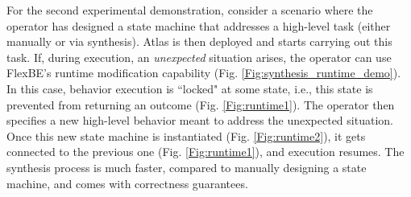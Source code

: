 For the second experimental demonstration, consider a scenario where the operator has designed a state machine that addresses a high-level task (either manually or via synthesis).
Atlas is then deployed and starts carrying out this task.
If, during execution, an \emph{unexpected} situation arises, the operator can use FlexBE's runtime modification capability \cite{Philipp2015MSc} (Fig. \ref{Fig:synthesis_runtime_demo}).
In this case, behavior execution is ``locked" at some state, i.e., this state is prevented from returning an outcome (Fig. \ref{Fig:runtime1}). 
The operator then specifies a new high-level behavior meant to address the unexpected situation.
Once this new state machine is instantiated (Fig. \ref{Fig:runtime2}), it gets connected to the previous one (Fig. \ref{Fig:runtime1}), and execution resumes.
The synthesis process is much faster, compared to manually designing a state machine, and comes with correctness guarantees.

